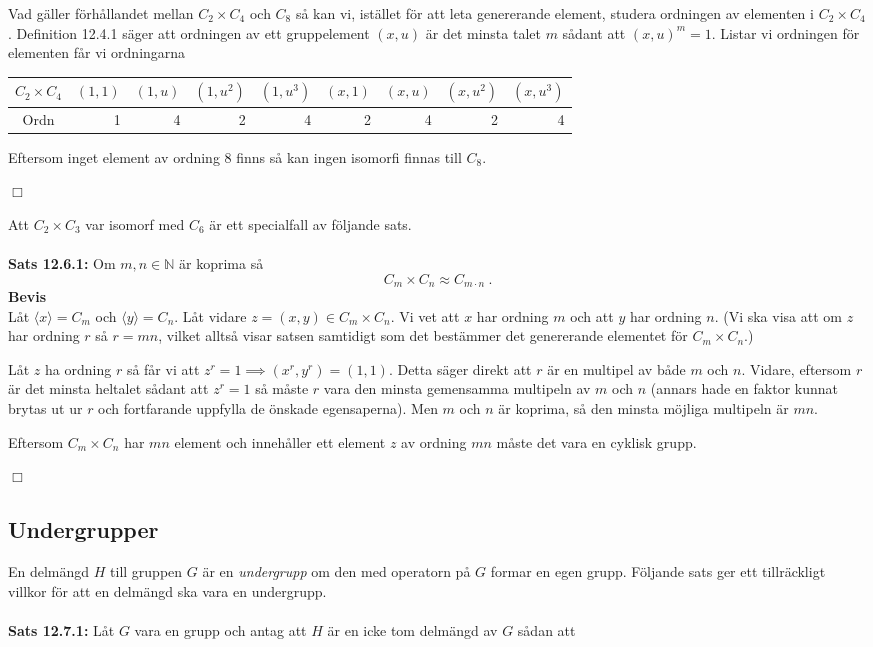 \documentclass{article}
\begin{document}
Vad gäller förhållandet mellan $C_2\times C_4$ och $C_8$ så kan vi, istället för att leta genererande element, studera ordningen av elementen i $C_2\times C_4$. Definition 12.4.1 säger att ordningen av ett gruppelement $(x,u)$ är det minsta talet $m$ sådant att $(x,u)^m=1$. Listar vi ordningen för elementen får vi ordningarna
\begin{center}
\begin{tabular}{c | r r r r r r r r}
$C_2\times C_4$ & $(1,1)$ & $(1,u)$ & $(1,u^2)$ & $(1,u^3)$ & $(x,1)$ & $(x,u)$ & $(x,u^2)$ & $(x,u^3)$\\
\hline
Ordn & 1 & 4 & 2 & 4 & 2 & 4 & 2 & 4
\end{tabular}
\end{center}
Eftersom inget element av ordning $8$ finns så kan ingen isomorfi finnas till $C_8$.
\begin{flushright}
$\Box$
\end{flushright}
Att $C_2\times C_3$ var isomorf med $C_6$ är ett specialfall av följande sats.\\ \\
\textbf{Sats 12.6.1:} Om $m,n\in\mathbb{N}$ är koprima så
$$
C_m\times C_n\approx C_{m\cdot n} \ .
$$
\textbf{Bevis}\\ 
Låt $\langle x\rangle=C_m$ och $\langle y\rangle=C_n$. Låt vidare $z=(x,y)\in C_m\times C_n$. Vi vet att $x$ har ordning $m$ och att $y$ har ordning $n$. (Vi ska visa att om $z$ har ordning $r$ så $r=mn$, vilket alltså visar satsen samtidigt som det bestämmer det genererande elementet för $C_m\times C_n.$)

Låt $z$ ha ordning $r$ så får vi att $z^r=1\implies (x^r,y^r)=(1,1).$ Detta säger direkt att $r$ är en multipel av både $m$ och $n$. Vidare, eftersom $r$ är det minsta heltalet sådant att $z^r=1$ så måste $r$ vara den minsta gemensamma multipeln av $m$ och $n$ (annars hade en faktor kunnat brytas ut ur $r$ och fortfarande uppfylla de önskade egensaperna). Men $m$ och $n$ är koprima, så den minsta möjliga multipeln är $mn$.

Eftersom $C_m\times C_n$ har $mn$ element och innehåller ett element $z$ av ordning $mn$ måste det vara en cyklisk grupp.
\begin{flushright}
$\Box$
\end{flushright}

\subsection{Undergrupper}
En delmängd $H$ till gruppen $G$ är en \textit{undergrupp} om den med operatorn på $G$ formar en egen grupp. Följande sats ger ett tillräckligt villkor för att en delmängd ska vara en undergrupp.\\ \\ 
\textbf{Sats 12.7.1:} Låt $G$ vara en grupp och antag att $H$ är en icke tom delmängd av $G$ sådan att\\
\end{document}

